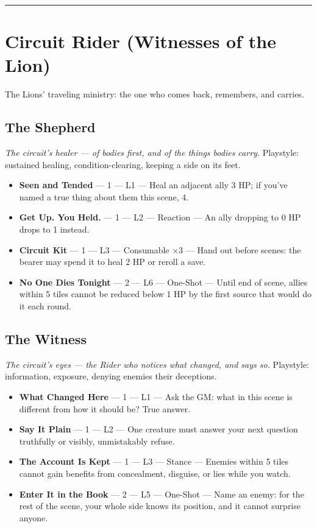 \medskip\hrule\medskip

\section{Circuit Rider \textnormal{(Witnesses of the Lion)}}

The Lions' traveling ministry: the one who comes back, remembers, and carries.

\subsection{The Shepherd}
\textit{The circuit's healer --- of bodies first, and of the things bodies carry.} Playstyle: sustained healing, condition-clearing, keeping a side on its feet.
\begin{itemize}
    \item \textbf{Seen and Tended} --- 1 --- L1 --- Heal an adjacent ally 3 HP; if you've named a true thing about them this scene, 4.
    \item \textbf{Get Up. You Held.} --- 1 --- L2 --- Reaction --- An ally dropping to 0 HP drops to 1 instead.
    \item \textbf{Circuit Kit} --- 1 --- L3 --- Consumable ×3 --- Hand out before scenes: the bearer may spend it to heal 2 HP or reroll a save.
    \item \textbf{No One Dies Tonight} --- 2 --- L6 --- One-Shot --- Until end of scene, allies within 5 tiles cannot be reduced below 1 HP by the first source that would do it each round.
\end{itemize}

\subsection{The Witness}
\textit{The circuit's eyes --- the Rider who notices what changed, and says so.} Playstyle: information, exposure, denying enemies their deceptions.
\begin{itemize}
    \item \textbf{What Changed Here} --- 1 --- L1 --- Ask the GM: what in this scene is different from how it should be? True answer.
    \item \textbf{Say It Plain} --- 1 --- L2 --- One creature must answer your next question truthfully or visibly, unmistakably refuse.
    \item \textbf{The Account Is Kept} --- 1 --- L3 --- Stance --- Enemies within 5 tiles cannot gain benefits from concealment, disguise, or lies while you watch.
    \item \textbf{Enter It in the Book} --- 2 --- L5 --- One-Shot --- Name an enemy: for the rest of the scene, your whole side knows its position, and it cannot surprise anyone.
\end{itemize}


